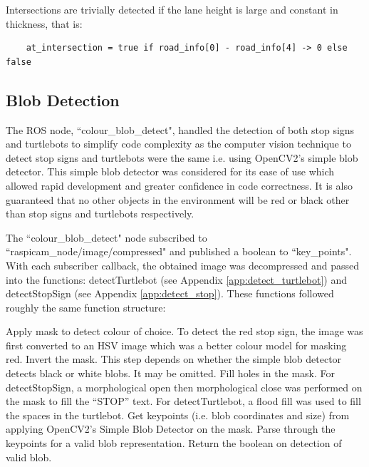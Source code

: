 \documentclass[11pt]{article}
\begin{document}
    Intersections are trivially detected if the lane height is large and constant in thickness, that is:

    \begin{verbatim}
    at_intersection = true if road_info[0] - road_info[4] -> 0 else false
    \end{verbatim}

    \subsection{Blob Detection}

    The ROS node, ``colour\_blob\_detect", handled the detection of both stop signs and turtlebots to simplify code complexity as the computer vision technique to detect stop signs and turtlebots were the same i.e. using OpenCV2's simple blob detector. This simple blob detector was considered for its ease of use which allowed rapid development and greater confidence in code correctness. It is also guaranteed that no other objects in the environment will be red or black other than stop signs and turtlebots respectively.
    
    The ``colour\_blob\_detect" node subscribed to ``raspicam\_node/image/compressed" and published a boolean to ``key\_points". With each subscriber callback, the obtained image was decompressed and passed into the functions: detectTurtlebot (see Appendix \ref{app:detect_turtlebot}) and detectStopSign (see Appendix \ref{app:detect_stop}). These functions followed roughly the same function structure:
    \begin{outline}[enumerate]
        \1 Apply mask to detect colour of choice.
            \2 To detect the red stop sign, the image was first converted to an HSV image which was a better colour model for masking red.
        \1 Invert the mask.
            \2 This step depends on whether the simple blob detector detects black or white blobs. It may be omitted.
        \1 Fill holes in the mask.
            \2 For detectStopSign, a morphological open then morphological close was performed on the mask to fill the ``STOP'' text.
            \2 For detectTurtlebot, a flood fill was used to fill the spaces in the turtlebot.
        \1 Get keypoints (i.e. blob coordinates and size) from applying OpenCV2's Simple Blob Detector on the mask.
        \1 Parse through the keypoints for a valid blob representation.
        \1 Return the boolean on detection of valid blob.
    \end{outline}
\end{document}
